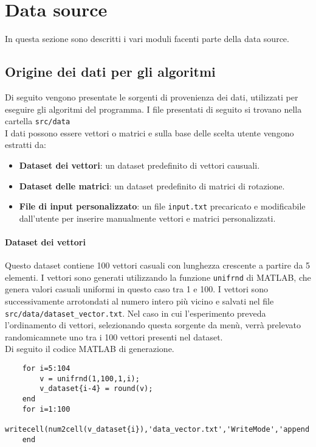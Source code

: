 \newpage
\section{Data source} \label{sec:data_source}
In questa sezione sono descritti i vari moduli facenti parte della data source.

\subsection{Origine dei dati per gli algoritmi}
Di seguito vengono presentate le sorgenti di provenienza dei dati, utilizzati per eseguire gli algoritmi del programma. I file presentati di seguito si trovano nella cartella \texttt{src/data} \\

\noindent I dati possono essere vettori o matrici e sulla base delle scelta utente vengono estratti da:  
\begin{itemize}
    \item \textbf{Dataset dei vettori}: un dataset predefinito di vettori causuali.
    \item \textbf{Dataset delle matrici}: un dataset predefinito di matrici di rotazione.
    \item \textbf{File di input personalizzato}: un file \texttt{input.txt} precaricato e modificabile dall'utente per inserire manualmente vettori e matrici personalizzati.
\end{itemize}

\paragraph{Dataset dei vettori}
Questo dataset contiene 100 vettori casuali con lunghezza crescente a partire da 5 elementi. I vettori sono generati utilizzando la funzione \texttt{unifrnd} di MATLAB, che genera valori casuali uniformi in questo caso tra 1 e 100. I vettori sono successivamente arrotondati al numero intero più vicino e salvati nel file \texttt{src/data/dataset\_vector.txt}.
Nel caso in cui l'esperimento preveda l'ordinamento di vettori, selezionando questa sorgente da menù, verrà prelevato randomicamnete uno tra i 100 vettori presenti nel dataset.\\
Di seguito il codice MATLAB di generazione.

\begin{verbatim}
    for i=5:104
        v = unifrnd(1,100,1,i);
        v_dataset{i-4} = round(v);
    end
    for i=1:100
        writecell(num2cell(v_dataset{i}),'data_vector.txt','WriteMode','append');
    end
\end{verbatim}

